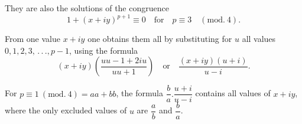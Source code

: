 They are also the solutions of the congruence
\[
1+(x+iy)^{p+1}\equiv0\quad\text{for}\quad p\equiv3\quad(\mathrm{mod.}\ 4).
\]
\par\indent From one value $x+iy$ one obtains them all by substituting for $u$ all values\\
$0,1,2,3,\, .\, .\, .,p-1$, using the formula
\[
(x+iy)\left(\frac{uu-1+2iu}{uu+1}\right)\quad\text{or}\quad\frac{(x+iy)(u+i)}{u-i}.
\]
\par\indent For $p\equiv1\ (\mathrm{mod.}\ 4)=aa+bb$, the formula $\dfrac{b}{a}.\dfrac{u+i}{u-i}$ contains all values of $x+iy$, where the only excluded values of $u$ are $\dfrac{a}{b}$ and $\dfrac{b}{a}$.
